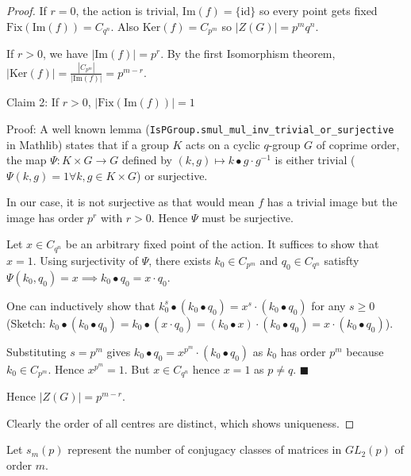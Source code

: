 \begin{proof}
    If $r = 0$, the action is trivial, $\text{Im}(f) = \{\text{id}\}$ so every point gets fixed $\text{Fix}(\text{Im}(f)) = C_{q^n}$. Also $\text{Ker}(f) = C_{p^m}$ so $|Z(G)| = p^m q^n$.

    If $r > 0$, we have $|\text{Im}(f)| = p^r$. By the first Isomorphism theorem, $|\text{Ker}(f)| = \frac{|C_{p^m}|}{|\text{Im}(f)|} = p^{m - r}$.

    Claim 2: If $r > 0$, $|\text{Fix}(\text{Im}(f))| = 1$

    Proof: A well known lemma (\texttt{IsPGroup.smul_mul_inv_trivial_or_surjective} in Mathlib) states that if a group $K$ acts on a cyclic $q$-group $G$ of coprime order, the map $\Psi : K \times G \to G$ defined by $(k, g) \mapsto k \bullet g \cdot g^{-1}$ is either trivial ($\Psi(k, g) = 1 \forall k, g \in K \times G$) or surjective. 
    
    In our case, it is not surjective as that would mean $f$ has a trivial image but the image has order $p^r$ with $r > 0$. Hence $\Psi$ must be surjective. 
    
    Let $x \in C_{q^n}$ be an arbitrary fixed point of the action. It suffices to show that $x = 1$. Using surjectivity of $\Psi$, there exists $k_0 \in C_{p^m}$ and $q_0 \in C_{q^n}$ satisfty $\Psi(k_0, q_0) = x \implies k_0 \bullet q_0 = x \cdot q_0$. 
    
    One can inductively show that $k_0^s \bullet (k_0 \bullet q_0) = x^s \cdot (k_0 \bullet q_0)$ for any $s \geq 0$ (Sketch: $k_0 \bullet (k_0 \bullet q_0) = k_0 \bullet (x \cdot q_0) = (k_0 \bullet x) \cdot (k_0 \bullet q_0) = x \cdot (k_0 \bullet q_0)$). 
    
    Substituting $s = p^m$ gives $k_0 \bullet q_0 = x^{p^m} \cdot (k_0 \bullet q_0)$ as $k_0$ has order $p^m$ because $k_0 \in C_{p^m}$. Hence $x^{p^m} = 1$. But $x \in C_{q^n}$ hence $x = 1$ as $p \neq q$. $\blacksquare$

    Hence $|Z(G)| = p^{m - r}$.

    Clearly the order of all centres are distinct, which shows uniqueness.
\end{proof}

Let $s_m(p)$ represent the number of conjugacy classes of matrices in $GL_2(p)$ of order $m$.

